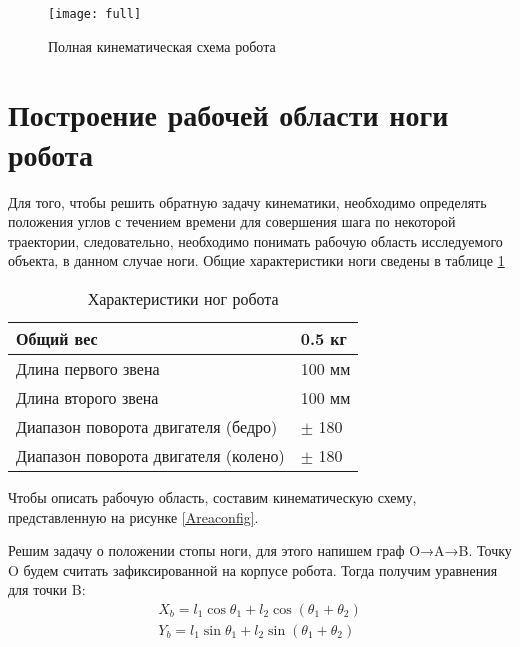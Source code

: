 \begin{figure}[h!]
	\begin{center}
		\texttt{[image: full]}
		\caption{Полная кинематическая схема робота}
		\label{full}
	\end{center}
\end{figure}

\section{Построение рабочей области ноги робота}\label{C2_2}
Для того, чтобы решить обратную задачу кинематики, необходимо определять положения углов с течением времени для совершения шага по некоторой траектории, следовательно, необходимо понимать рабочую область исследуемого объекта, в данном случае ноги. Общие характеристики ноги сведены в таблице \ref{tablParam}


\begin{table}[h]
	\begin{center}
		\caption{Характеристики ног робота}
		\label{tablParam}
		\begin{tabular}{| l | l |}
			\hline
			Общий вес   &    0.5 кг \\ \hline
			Длина первого звена & 100 мм\\ \hline
			Длина второго звена & 100 мм \\ \hline
			Диапазон поворота двигателя (бедро) & $\pm$ 180 \\ \hline
			Диапазон поворота двигателя (колено) & $\pm$ 180 \\ \hline
		\end{tabular}
	\end{center}
\end{table}

Чтобы описать рабочую область, составим кинематическую схему, представленную на рисунке \ref{Areaconfig}.

Решим задачу о положении стопы ноги, для этого напишем граф O→A→B. Точку O будем считать зафиксированной на корпусе робота. 
\newline
Тогда получим уравнения для точки B:
\begin{equation}
\begin{array}{l}
	X_{b} = l_{1}\cos{\theta_1}+l_{2}\cos({\theta_1+\theta_2}) 
	\\
	Y_{b} = l_{1}\sin{\theta_1}+l_{2}\sin({\theta_1+\theta_2})
\end{array}
\end{equation}

